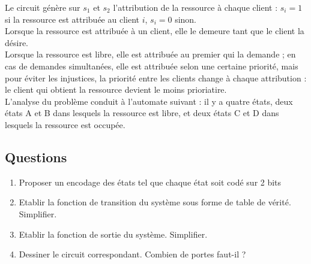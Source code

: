 \documentclass[a4paper,11pt]{article}
\begin{document}
Le circuit génère sur $s_1$ et $s_2$ l'attribution de la ressource à chaque client : $s_i=1$ si la ressource est attribuée au client $i$, $s_i=0$ sinon.\\

Lorsque la ressource est attribuée à un client, elle le demeure tant que le client la désire.\\

Lorsque la ressource est libre, elle est attribuée au premier qui la demande ; en cas de demandes simultanées, elle est attribuée selon une certaine priorité, mais pour éviter les injustices, la priorité entre les clients change à chaque attribution : le client qui obtient la ressource devient le moins prioriatire.\\

L'analyse du problème conduit à l'automate suivant : il y a quatre états, deux états A et B dans lesquels la ressource est libre, et deux états C et D dans lesquels la ressource est occupée.

\subsection*{Questions}
\begin{enumerate}
\item Proposer un encodage des états tel que chaque état soit codé sur 2 bits
\item Etablir la fonction de transition du système sous forme de table de vérité. Simplifier.
\item Etablir la fonction de sortie du système. Simplifier.
\item Dessiner le circuit correspondant. Combien de portes faut-il ?
\end{enumerate}
\end{document}
